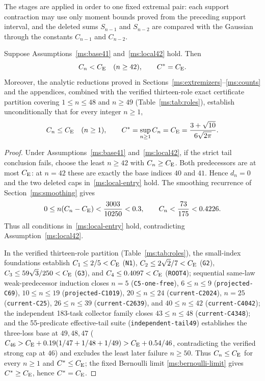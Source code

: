 The stages are applied in order to one fixed extremal pair: each support
contraction may use only moment bounds proved from the preceding support
interval, and the deleted sums $S_{n-1}$ and $S_{n-2}$ are compared with
the Gaussian through the constants $C_{n-1}$ and $C_{n-2}$.

\begin{theorem}\label{ms:conditional-global}
Suppose Assumptions~\ref{ms:base41} and~\ref{ms:local42} hold. Then
\[
 C_n<C_{\mathrm E}\quad(n\ge42),\qquad C^*=C_{\mathrm E}.
\]
Moreover, the analytic reductions proved in Sections~\ref{ms:extremizers}--\ref{ms:counts}
and the appendices, combined with the verified thirteen-role exact certificate
partition covering $1\le n\le48$ and $n\ge49$ (Table~\ref{ms:tab:roles}),
establish unconditionally that for every integer $n\ge1$,
\[
 C_n\le C_{\mathrm E}\quad(n\ge1),\qquad C^*=\sup_{n\ge1}C_n=C_{\mathrm E}=\frac{3+\sqrt{10}}{6\sqrt{2\pi}}.
\]
\end{theorem}
\begin{proof}
Under Assumptions~\ref{ms:base41} and~\ref{ms:local42}, if the strict tail
conclusion fails, choose the least $n\ge42$ with $C_n\ge C_{\mathrm E}$. Both
predecessors are at most $C_{\mathrm E}$: at $n=42$ these are
exactly the base indices $40$ and $41$. Hence $d_n=0$ and the two
deleted caps in~\eqref{ms:local-entry} hold. The smoothing recurrence
of Section~\ref{ms:smoothing} gives
\[
 0\le n(C_n-C_{\mathrm E})<\frac{3003}{10250}<0.3,
 \qquad C_n<\frac{73}{175}<0.4226.
\]
Thus all conditions in~\eqref{ms:local-entry} hold, contradicting
Assumption~\ref{ms:local42}.

In the verified thirteen-role partition (Table~\ref{ms:tab:roles}),
the small-index foundations establish $C_1\le2/5<C_{\mathrm E}$ (\texttt{N1}),
$C_2\le2\sqrt2/7<C_{\mathrm E}$ (\texttt{G2}), $C_3\le59\sqrt3/250<C_{\mathrm E}$ (\texttt{G3}),
and $C_4\le0.4097<C_{\mathrm E}$ (\texttt{ROOT4}); sequential same-law weak-predecessor
induction closes $n=5$ (\texttt{C5-one-free}), $6\le n\le9$
(\texttt{projected-C69}), $10\le n\le19$ (\texttt{projected-C1019}),
$20\le n\le24$ (\texttt{current-C2024}), $n=25$ (\texttt{current-C25}),
$26\le n\le39$ (\texttt{current-C2639}), and $40\le n\le42$
(\texttt{current-C4042}); the independent 183-task collector family closes
$43\le n\le48$ (\texttt{current-C4348}); and the 55-predicate effective-tail
suite (\texttt{independent-tail49}) establishes the three-loss base at
$49,48,47$ ($C_{46}>C_{\mathrm E}+0.19(1/47+1/48+1/49)>C_{\mathrm E}+0.54/46$, contradicting the
verified strong cap at $46$) and excludes the least later failure $n\ge50$.
Thus $C_n\le C_{\mathrm E}$ for every $n\ge1$ and $C^*\le C_{\mathrm E}$; the fixed Bernoulli limit
\eqref{ms:bernoulli-limit} gives $C^*\ge C_{\mathrm E}$, hence $C^*=C_{\mathrm E}$.
\end{proof}

